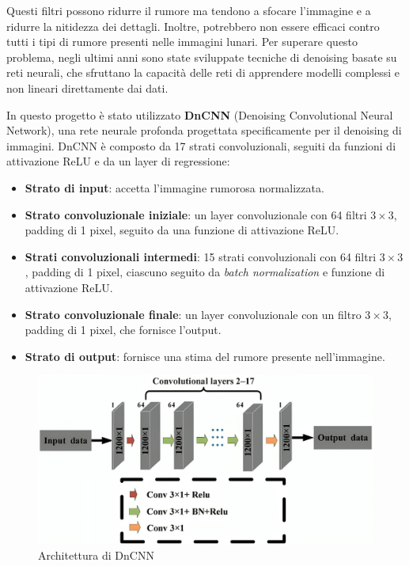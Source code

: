 Questi filtri possono ridurre il rumore ma tendono a sfocare l'immagine e a ridurre la nitidezza dei dettagli. Inoltre, potrebbero non essere efficaci contro tutti i tipi di rumore presenti nelle immagini lunari. Per superare questo problema, negli ultimi anni sono state sviluppate tecniche di denoising basate su reti neurali, che sfruttano la capacità delle reti di apprendere modelli complessi e non lineari direttamente dai dati.

In questo progetto è stato utilizzato \textbf{DnCNN} (Denoising Convolutional Neural Network), una rete neurale profonda progettata specificamente per il denoising di immagini. DnCNN è composto da 17 strati convoluzionali, seguiti da funzioni di attivazione ReLU e da un layer di regressione:

\begin{itemize}
    \item \textbf{Strato di input}: accetta l'immagine rumorosa normalizzata.
    \item \textbf{Strato convoluzionale iniziale}: un layer convoluzionale con 64 filtri $3 \times 3$, padding di 1 pixel, seguito da una funzione di attivazione ReLU. \item \textbf{Strati convoluzionali intermedi}: 15 strati convoluzionali con 64 filtri $3 \times 3$, padding di 1 pixel, ciascuno seguito da \textit{batch normalization} e funzione di attivazione ReLU. \item \textbf{Strato convoluzionale finale}: un layer convoluzionale con un filtro $3 \times 3$, padding di 1 pixel, che fornisce l'output. 
    \item \textbf{Strato di output}: fornisce una stima del rumore presente nell'immagine.
\end{itemize}

\begin{figure}[H]
    \centering
    \includegraphics[scale=0.3]{../assets/dncnn.png}
    \captionsetup{justification=centering}
    \caption{Architettura di DnCNN \cite{dncnn_img}} \label{fig:dncnn}
\end{figure}

